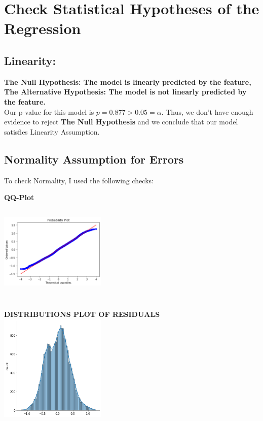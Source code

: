 \documentclass[10pt]{article}
\begin{document}
\section*{Check Statistical Hypotheses of the Regression}
\subsection*{Linearity:}
\textbf{The Null Hypothesis:  The model is linearly predicted by the feature,\\
The Alternative Hypothesis:  The model is not linearly predicted by the feature.}\\
Our p-value for this model is \(p=0.877 > 0.05 = \alpha\). Thus, we don't have enough evidence to reject \textbf{The Null Hypothesis} and  we conclude that our model satisfies Linearity Assumption.
\subsection*{Normality Assumption for Errors}
To check Normality, I used the following checks:\\
\begin{minipage}{0.5\textwidth}
\begin{center}
	\textbf{QQ-Plot}\\
	\includegraphics[width=2in,height=2in]{qq_plot_linear_model}
\end{center}%
\end{minipage}%
\begin{minipage}{0.5\textwidth}
	\begin{center}
		\textbf{DISTRIBUTIONS PLOT OF RESIDUALS}\\
		\includegraphics[width=2in,height=2in]{dist_plot_resid_linear_model}
	\end{center}%
\end{minipage}%
\end{document}
